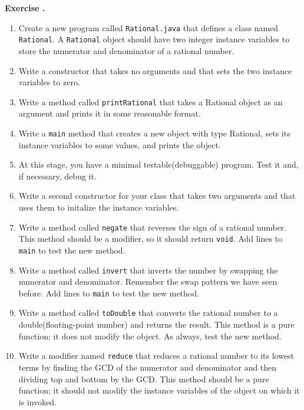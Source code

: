 \documentclass{book}
\newcounter{exercisenum}
\renewcommand{\theexercisenum}{{\thechapter}.\arabic{exercisenum}}
\newenvironment{exercisesize}{\begin{small}}{\end{small}}
\newcommand{\exerciseheader}[2]{                                          
     
  \begin{exercisesize}                                                    
     
     
  \def\theenumi{\alph{enumi}}                                             
  \def\labelenumi{\theenumi.}                                             
  \def\theenumii{\roman{enumii}}                                          
  \def\labelenumii{\theenumii.}                                           
  {\bf Exercise {#1}{#2}}\hspace{0.1in}                 
}
\newcommand{\startexercise}[1]{%
  \refstepcounter{exercisenum}                                            
  \exerciseheader{\theexercisenum}{#1}                                    
}
\newcommand{\stopexercise}{%
  {\hfill}                                                               
  \end{exercisesize}      
}
\newcommand{\normaldif}{}
\newenvironment{exercise}{\startexercise{\normaldif{}}}{\stopexercise}
\begin{document}
\begin{exercise}
\begin{enumerate}
\item Create a new program called {\tt Rational.java} that defines a
class named {\tt Rational}.  A {\tt Rational} object should have two
integer instance variables to store the numerator and denominator of a
rational number.

\item Write a constructor that takes no arguments and that sets the
two instance variables to zero.

\item Write a method called {\tt printRational} that takes
a Rational object as an argument and prints it in some
reasonable format.

\item Write a {\tt main} method that creates a new object with
type Rational, sets its instance variables to some values, and prints
the object.

\item At this stage, you have a minimal testable(debuggable)
program.  Test it and, if necessary, debug it.

\item Write a second constructor for your class that takes two
arguments and that uses them to initalize the instance
variables.

\item Write a method called {\tt negate} that reverses the sign of
a rational number.  This method should be a modifier, so it should
return {\tt void}.  Add lines to {\tt main} to test the new method.

\item Write a method called {\tt invert} that inverts the number by
swapping the numerator and denominator.  Remember the swap pattern we
have seen before.  Add lines to {\tt main} to test the new method.

\item Write a method called {\tt toDouble} that converts the rational
number to a double(floating-point number) and returns the result.
This method is a pure function; it does not modify the object.
As always, test the new method.

\item Write a modifier named {\tt reduce} that reduces a rational number
to its lowest terms by finding the GCD of the numerator and denominator
and then dividing top and bottom by the GCD.
This method should be a pure function; it should not modify
the instance variables of the object on which it is invoked.


\end{enumerate}
\end{exercise}
\end{document}
